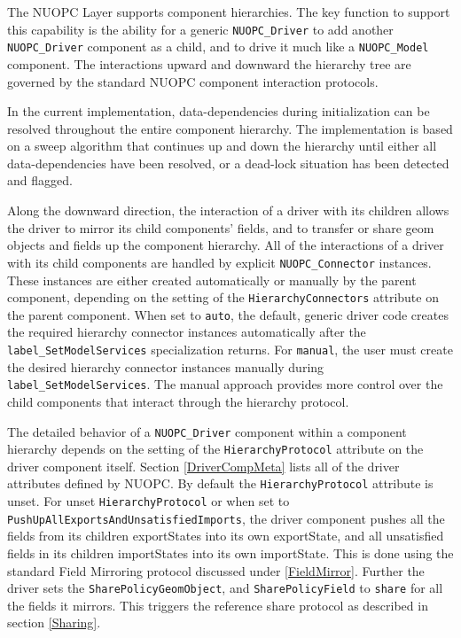 %

\label{ComponentHierarchy}

The NUOPC Layer supports component hierarchies. The key function to support this capability is the ability for a generic {\tt NUOPC\_Driver} to add another {\tt NUOPC\_Driver} component as a child, and to drive it much like a {\tt NUOPC\_Model} component. The interactions upward and downward the hierarchy tree are governed by the standard NUOPC component interaction protocols.

In the current implementation, data-dependencies during initialization can be resolved throughout the entire component hierarchy. The implementation is based on a sweep algorithm that continues up and down the hierarchy until either all data-dependencies have been resolved, or a dead-lock situation has been detected and flagged.

Along the downward direction, the interaction of a driver with its children allows the driver to mirror its child components' fields, and to transfer or share geom objects and fields up the component hierarchy. All of the interactions of a driver with its child components are handled by explicit {\tt NUOPC\_Connector} instances. These instances are either created automatically or manually by the parent component, depending on the setting of the {\tt HierarchyConnectors} attribute on the parent component. When set to {\tt auto}, the default, generic driver code creates the required hierarchy connector instances automatically after the {\tt label\_SetModelServices} specialization returns. For {\tt manual}, the user must create the desired hierarchy connector instances manually during {\tt label\_SetModelServices}. The manual approach provides more control over the child components that interact through the hierarchy protocol.

The detailed behavior of a {\tt NUOPC\_Driver} component within a component hierarchy depends on the setting of the {\tt HierarchyProtocol} attribute on the driver component itself. Section \ref{DriverCompMeta} lists all of the driver attributes defined by NUOPC. By default the {\tt HierarchyProtocol} attribute is unset. For unset {\tt HierarchyProtocol} or when set to {\tt PushUpAllExportsAndUnsatisfiedImports}, the driver component pushes all the fields from its children exportStates into its own exportState, and all unsatisfied fields in its children importStates into its own importState. This is done using the standard Field Mirroring protocol discussed under \ref{FieldMirror}. Further the driver sets the {\tt SharePolicyGeomObject}, and 
{\tt SharePolicyField} to {\tt share} for all the fields it mirrors. This triggers the reference share protocol as described in section \ref{Sharing}.

